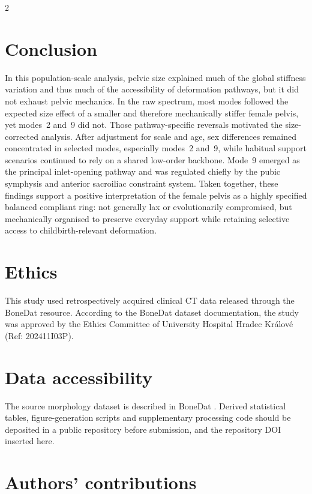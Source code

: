 \documentclass[openacc]{rsproca_new}
\begin{document}
\begin{multicols}{2}
\section{Conclusion}

In this population-scale analysis, pelvic size explained much of the global stiffness variation and thus much of the accessibility of deformation pathways, but it did not exhaust pelvic mechanics. In the raw spectrum, most modes followed the expected size effect of a smaller and therefore mechanically stiffer female pelvis, yet modes~2 and~9 did not. Those pathway-specific reversals motivated the size-corrected analysis. After adjustment for scale and age, sex differences remained concentrated in selected modes, especially modes~2 and~9, while habitual support scenarios continued to rely on a shared low-order backbone. Mode~9 emerged as the principal inlet-opening pathway and was regulated chiefly by the pubic symphysis and anterior sacroiliac constraint system. Taken together, these findings support a positive interpretation of the female pelvis as a highly specified balanced compliant ring: not generally lax or evolutionarily compromised, but mechanically organised to preserve everyday support while retaining selective access to childbirth-relevant deformation.

\section*{Ethics}

This study used retrospectively acquired clinical CT data released through the BoneDat resource. According to the BoneDat dataset documentation, the study was approved by the Ethics Committee of University Hospital Hradec Kr\'{a}lov\'{e} (Ref: 202411I03P).

\section*{Data accessibility}

The source morphology dataset is described in BoneDat \cite{HenysKuchar2025}. Derived statistical tables, figure-generation scripts and supplementary processing code should be deposited in a public repository before submission, and the repository DOI inserted here.

\section*{Authors' contributions}


\end{multicols}
\end{document}
